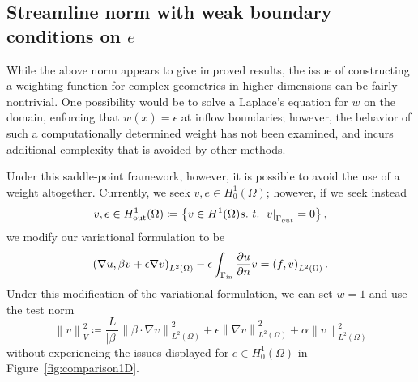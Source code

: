 \documentclass[final,leqno]{siamltex}
\newcommand{\nor}[1]{\left\| #1 \right\|}
\newcommand{\LRp}[1]{\left( #1 \right)}
\newcommand{\LRc}[1]{\left\{ #1 \right\}}
\newcommand{\LRb}[1]{\left| #1 \right|}
\newcommand{\Grad} {\ensuremath{\nabla}}
\renewcommand{\L}{L^2\LRp{\Omega}}
\newcommand{\pd}[2]{\frac{\partial#1}{\partial#2}}
\begin{document}
\subsection{Streamline norm with weak boundary conditions on $e$}

While the above norm appears to give improved results, the issue of constructing a weighting function for complex geometries in higher dimensions can be fairly nontrivial.  One possibility would be to solve a Laplace's equation for $w$ on the domain, enforcing that $w(x) = \epsilon$ at inflow boundaries; however, the behavior of such a computationally determined weight has not been examined, and incurs additional complexity that is avoided by other methods.  

Under this saddle-point framework, however, it is possible to avoid the use of a weight altogether.  Currently, we seek $v,e\in H^1_0(\Omega)$; however, if we seek instead 
\[
v,e\in H^1_{\rm out}(\Omega) \coloneqq \LRc{v\in H^1(\Omega) s.\ t.\ \left.v\right|_{\Gamma_{out}} = 0},
\]
we modify our variational formulation to be
\[
\LRp{\Grad u,\beta v + \epsilon \Grad v}_{\L} - \epsilon\int_{\Gamma_{\rm in}} \pd{u}{n}v = \LRp{f,v}_{\L}.
\]
Under this modification of the variational formulation, we can set $w=1$ and use the test norm
\[
\nor{v}_{V}^2 \coloneqq \frac{L}{\LRb{\beta}}\nor{\beta\cdot \Grad v}_{\L}^2 + \epsilon\nor{\Grad v}_{\L}^2 + \alpha\nor{v}_{\L}^2
\]
without experiencing the issues displayed for $e\in H^1_0(\Omega)$ in Figure~\ref{fig:comparison1D}.  
\end{document}
